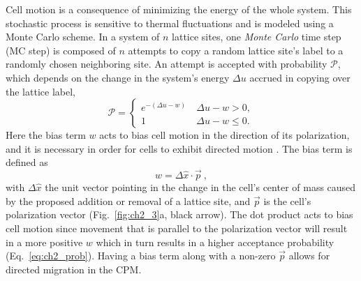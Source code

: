 Cell motion is a consequence of minimizing the energy of the whole system. This stochastic process is sensitive to thermal fluctuations and is modeled using a Monte Carlo scheme. In a system of $n$ lattice sites, one \textit{Monte Carlo} time step (MC step) is composed of $n$ attempts to copy a random lattice site's label to a randomly chosen neighboring site. An attempt is accepted with probability $\mathcal{P}$, which depends on the change in the system's energy $\Delta u$ accrued in copying over the lattice label,
\begin{equation} \label{eq:ch2_prob}
    \mathcal{P} =
    \begin{cases}
        e^{-\left( \Delta u - w \right)} &\ \Delta u - w > 0 , \\
        1 &\ \Delta u - w \leq 0 .
    \end{cases}
\end{equation}
Here the bias term $w$ acts to bias cell motion in the direction of its polarization, and it is necessary in order for cells to exhibit directed motion \cite{szabo2010collective}.
The bias term is defined as
\begin{equation}
    w = \Delta\hat{x} \cdot \vec{p} \ ,
\end{equation}
with $\Delta\hat{x}$ the unit vector pointing in the change in the cell's center of mass caused by the proposed addition or removal of a lattice site, and $\vec{p}$ is the cell's polarization vector (Fig.\ \ref{fig:ch2_3}a, black arrow). The dot product acts to bias cell motion since movement that is parallel to the polarization vector will result in a more positive $w$ which in turn results in a higher acceptance probability (Eq.\ \ref{eq:ch2_prob}). Having a bias term along with a non-zero $\vec{p}$ allows for directed migration in the CPM.

